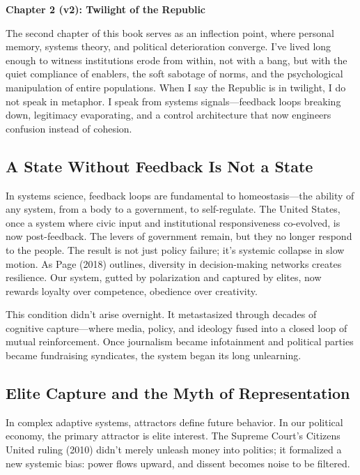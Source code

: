 \documentclass[
]{article}
\author{}
\date{}
\begin{document}
\textbf{Chapter 2 (v2): Twilight of the Republic}

The second chapter of this book serves as an inflection point, where personal memory, systems theory, and political deterioration converge. I've lived long enough to witness institutions erode from within, not with a bang, but with the quiet compliance of enablers, the soft sabotage of norms, and the psychological manipulation of entire populations. When I say the Republic is in twilight, I do not speak in metaphor. I speak from systems signals---feedback loops breaking down, legitimacy evaporating, and a control architecture that now engineers confusion instead of cohesion.

\subsection{A State Without Feedback Is Not a State}\label{a-state-without-feedback-is-not-a-state}

In systems science, feedback loops are fundamental to homeostasis---the ability of any system, from a body to a government, to self-regulate. The United States, once a system where civic input and institutional responsiveness co-evolved, is now post-feedback. The levers of government remain, but they no longer respond to the people. The result is not just policy failure; it's systemic collapse in slow motion. As Page (2018) outlines, diversity in decision-making networks creates resilience. Our system, gutted by polarization and captured by elites, now rewards loyalty over competence, obedience over creativity.

This condition didn't arise overnight. It metastasized through decades of cognitive capture---where media, policy, and ideology fused into a closed loop of mutual reinforcement. Once journalism became infotainment and political parties became fundraising syndicates, the system began its long unlearning.

\subsection{Elite Capture and the Myth of Representation}\label{elite-capture-and-the-myth-of-representation}

In complex adaptive systems, attractors define future behavior. In our political economy, the primary attractor is elite interest. The Supreme Court's Citizens United ruling (2010) didn't merely unleash money into politics; it formalized a new systemic bias: power flows upward, and dissent becomes noise to be filtered.
\end{document}
